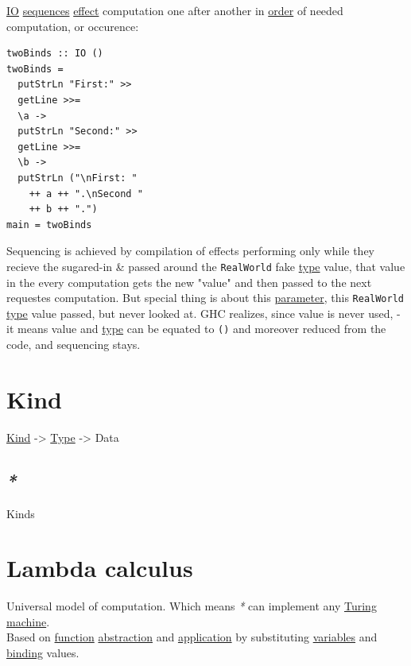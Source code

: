 \documentclass[a4paper,14pt,oneside]{book}
\begin{document}
\hyperref[org654a43e]{IO} \hyperref[org337fd10]{sequences} \hyperref[org3fe7088]{effect} computation one after another in \hyperref[orgf0a8035]{order} of needed computation, or occurence:\\

\begin{verbatim}
twoBinds :: IO ()
twoBinds =
  putStrLn "First:" >>
  getLine >>=
  \a ->
  putStrLn "Second:" >>
  getLine >>=
  \b ->
  putStrLn ("\nFirst: "
    ++ a ++ ".\nSecond "
    ++ b ++ ".")
main = twoBinds
\end{verbatim}

Sequencing is achieved by compilation of effects performing only while they recieve the sugared-in \& passed around the \texttt{RealWorld} fake \hyperref[orgc4a7610]{type} value, that value in the every computation gets the new "value" and then passed to the next requestes computation. But special thing is about this \hyperref[org63b5bc7]{parameter}, this \texttt{RealWorld} \hyperref[orgc4a7610]{type} value passed, but never looked at. GHC realizes, since value is never used, - it means value and \hyperref[orgc4a7610]{type} can be equated to \texttt{()} and moreover reduced from the code, and sequencing stays.\\

\chapter{\label{org67644b6}Kind}
\label{sec:org1f90497}
\hyperref[org67644b6]{Kind} -> \hyperref[orgc4a7610]{Type} -> Data\\

\section{\emph{*}}
\label{sec:org3b5f50a}

\label{org558ce98}Kinds\\

\chapter{\label{orgb662a27}Lambda calculus}
\label{sec:org2275321}
Universal model of computation. Which means \emph{*} can implement any \hyperref[org91ec957]{Turing machine}.\\
Based on \hyperref[orge00b05b]{function} \hyperref[orgd003800]{abstraction} and \hyperref[orgf09110d]{application} by substituting \hyperref[org329012b]{variables} and \hyperref[org9a498ee]{binding} values.\\
\end{document}
